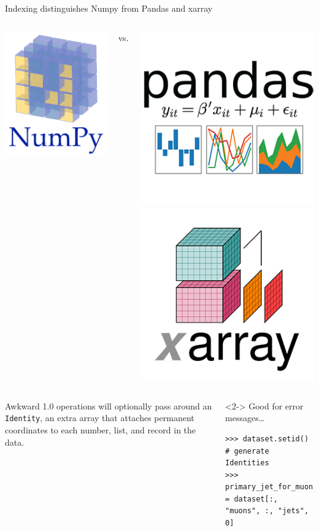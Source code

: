\documentclass[aspectratio=169]{beamer}
\begin{document}
\begin{frame}[fragile]{Indexing distinguishes Numpy from Pandas and xarray}
\large
\vspace{0.6 cm}
\begin{columns}
\column{1.5 cm}
\includegraphics[height=2 cm]{numpy-logo.png}

\column{0.5 cm}
\centering \huge vs.

\column{4.5 cm}
\includegraphics[height=2 cm]{pandas-logo.png}\hspace{0.5 cm}\includegraphics[height=2 cm]{xarray-logo.png}
\end{columns}

\vspace{0.5 cm}
\begin{columns}
Awkward 1.0 operations will optionally pass around an \texttt{Identity}, an extra array that attaches permanent coordinates to each number, list, and record in the data.

\vspace{0.25 cm}
\begin{uncoverenv}<2->
Good for error messages\ldots

\small
\begin{verbatim}
>>> dataset.setid()   # generate Identities
>>> primary_jet_for_muon = dataset[:, "muons", :, "jets", 0]
\end{verbatim}


\end{uncoverenv}
\end{columns}
\end{frame}
\end{document}
